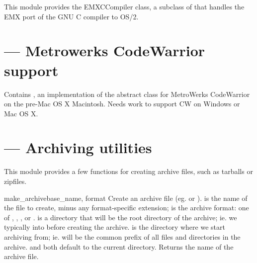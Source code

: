 \documentclass{manual}
\begin{document}
This module provides the EMXCCompiler class, a subclass of  that handles the EMX port of the GNU C compiler to OS/2.

\section{ --- Metrowerks CodeWarrior support}

Contains , an implementation of the abstract 
 class for MetroWerks CodeWarrior on the pre-Mac OS X Macintosh.
Needs work to support CW on Windows or Mac OS X.


%

\section{ --- 
			Archiving utilities}

This module provides a few functions for creating archive files, such as 
tarballs or zipfiles.

\begin{funcdesc}{make_archive}{base_name, format}
Create an archive file (eg.  or ).   
is the name of the file to create, minus any format-specific extension; 
 is the archive format: one of , , 
, or .
 is a directory that will be the root directory of the
archive; ie. we typically  into  before 
creating the archive.   is the directory where we start 
archiving from; ie.  will be the common prefix of all files and
directories in the archive.   and  both default
to the current directory.  Returns the name of the archive file.

\end{funcdesc}
\end{document}
